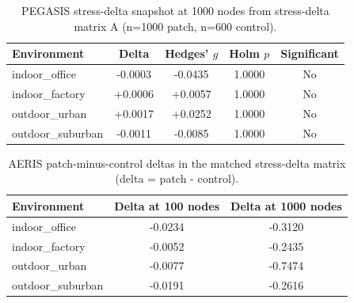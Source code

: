 ﻿\documentclass[sensors,article,submit,moreauthors,pdftex]{Definitions/mdpi}
\begin{document}
\begin{appendix}
\begin{table}[H]
\caption{PEGASIS stress-delta snapshot at 1000 nodes from stress-delta matrix A (n=1000 patch, n=600 control).}
\label{tab:s9_pegasis_1000}
\centering
\begin{tabular}{lcccc}
\toprule
Environment & Delta & Hedges' $g$ & Holm $p$ & Significant \\
\midrule
indoor\_office    & -0.0003 & -0.0435 & 1.0000 & No \\
indoor\_factory   & +0.0006 & +0.0057 & 1.0000 & No \\
outdoor\_urban    & +0.0017 & +0.0252 & 1.0000 & No \\
outdoor\_suburban & -0.0011 & -0.0085 & 1.0000 & No \\
\bottomrule
\end{tabular}
\end{table}

\begin{table}[H]
\caption{AERIS patch-minus-control deltas in the matched stress-delta matrix (delta = patch - control).}
\label{tab:s11_aeris_delta}
\centering
\begin{tabular}{lcc}
\toprule
Environment & Delta at 100 nodes & Delta at 1000 nodes \\
\midrule
indoor\_office    & -0.0234 & -0.3120 \\
indoor\_factory   & -0.0052 & -0.2435 \\
outdoor\_urban    & -0.0077 & -0.7474 \\
outdoor\_suburban & -0.0191 & -0.2616 \\
\bottomrule
\end{tabular}
\end{table}

\end{appendix}


\end{document}
